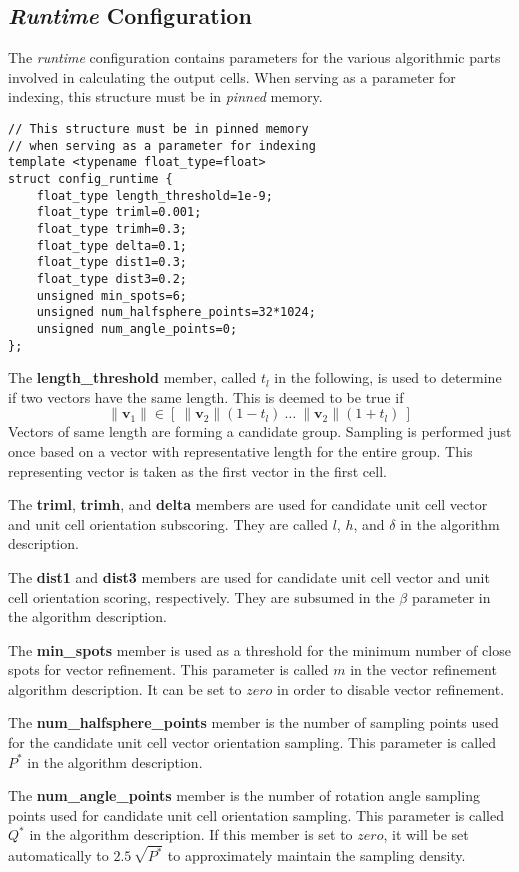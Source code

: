 \documentclass[a4paper,10pt]{article}
\newcommand{\vect}[1]{\mathbf{#1}}
\begin{document}
\subsection{\emph{Runtime} Configuration}

The \emph{runtime} configuration contains parameters for the various algorithmic parts involved in calculating the output cells. When serving as a parameter for indexing, this structure must be in \emph{pinned} memory.
%
\begin{lstlisting}
// This structure must be in pinned memory
// when serving as a parameter for indexing
template <typename float_type=float>
struct config_runtime {
    float_type length_threshold=1e-9;
    float_type triml=0.001;
    float_type trimh=0.3;
    float_type delta=0.1;
    float_type dist1=0.3;
    float_type dist3=0.2;
    unsigned min_spots=6;
    unsigned num_halfsphere_points=32*1024;
    unsigned num_angle_points=0;
};
\end{lstlisting}
%
The \textbf{length\_threshold} member, called $t_l$ in the following, is used to determine if two vectors have the same length. This is deemed to be true if
%
\[
\|\vect{v}_1\| \in \left [\:\|\vect{v}_2\|(1-t_l)\ \hdots\ \|\vect{v}_2\|(1+t_l)\: \right ]
\]
%
Vectors of same length are forming a candidate group. Sampling is performed just once based on a vector with representative length for the entire group. This representing vector is taken as the first vector in the first cell.

The \textbf{triml}, \textbf{trimh}, and \textbf{delta} members are used for candidate unit cell vector and unit cell orientation subscoring. They are called $l$, $h$, and $\delta$ in the algorithm description.

The \textbf{dist1} and \textbf{dist3} members are used for candidate unit cell vector and unit cell orientation scoring, respectively. They are subsumed in the $\beta$ parameter in the algorithm description.

The \textbf{min\_spots} member is used as a threshold for the minimum number of close spots for vector refinement. This parameter is called $m$ in the vector refinement algorithm description. It can be set to $zero$ in order to disable vector refinement.

The \textbf{num\_halfsphere\_points} member is the number of sampling points used for the candidate unit cell vector orientation sampling. This parameter is called $P^*$ in the algorithm description.

The \textbf{num\_angle\_points} member is the number of rotation angle sampling points used for candidate unit cell orientation sampling. This parameter is called $Q^*$ in the algorithm description. If this member is set to $zero$, it will be set automatically to $2.5\,\sqrt{P^*}$ to approximately maintain the sampling density.
\end{document}
